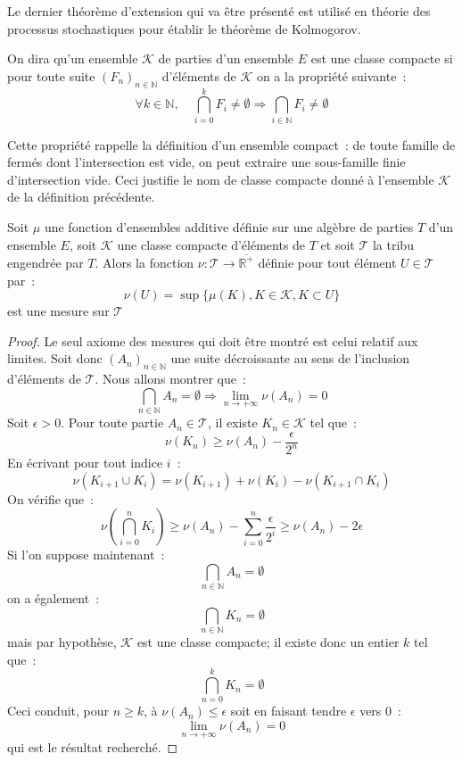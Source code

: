 Le dernier théorème d'extension qui va être présenté est utilisé en théorie des
processus stochastiques pour établir le théorème de Kolmogorov.
\begin{defn}
On dira qu'un ensemble $\mathcal{K}$ de parties d'un ensemble $E$ est une classe compacte
si pour toute suite $(F_n)_{n \in \mathbb{N}}$ d'\'el\'ements de $\mathcal{K}$ on a 
la propri\'et\'e suivante~:
\[
\forall k \in \mathbb{N}, \quad \bigcap_{i=0}^k F_i \neq \emptyset
\Rightarrow \bigcap_{i \in \mathbb{N}} F_i \neq \emptyset
\]
\end{defn}

Cette propri\'et\'e rappelle la d\'efinition d'un ensemble compact~: de toute famille
de ferm\'es dont l'intersection est vide, on peut extraire une sous-famille finie 
d'intersection vide. Ceci justifie le nom de classe compacte donn\'e \`a l'ensemble
$\mathcal{K}$ de la d\'efinition pr\'ec\'edente.

\begin{prop}
Soit $\mu$ une fonction d'ensembles additive d\'efinie sur une alg\`ebre de parties
$T$ d'un ensemble $E$, soit $\mathcal{K}$ une classe compacte d'\'el\'ements de $T$
et soit $\mathcal{T}$ la tribu engendr\'ee par $T$. Alors
la fonction $\nu : \mathcal{T} \to \overline{\mathbb{R}^+}$ d\'efinie 
pour tout \'el\'ement $U \in \mathcal{T}$ par~:
\[
\nu(U) = \sup \{\mu(K), K \in \mathcal{K}, K \subset U \}
\]
est une mesure sur $\mathcal{T}$
\end{prop}
\begin{proof}
Le seul axiome des mesures qui doit \^etre montr\'e est celui relatif aux limites. 
Soit donc $(A_n)_{n \in \mathbb{N}}$ une suite d\'ecroissante au sens de l'inclusion 
d'\'el\'ements de $\mathcal{T}$. Nous allons montrer que~:
\[
\bigcap_{n \in \mathbb{N}} A_n = \emptyset \Rightarrow \lim_{n \to +\infty} \nu(A_n) = 0
\]
Soit $\epsilon > 0$. Pour toute partie $A_n \in \mathcal{T}$, il existe $K_n \in \mathcal{K}$
tel que~:
$$
\nu(K_n) \geq \nu(A_n) - \frac{\epsilon}{2^n}
$$
En \'ecrivant pour tout indice $i$~:
\[
\nu(K_{i+1} \cup K_i ) = \nu(K_{i+1}) + \nu(K_i) - \nu(K_{i+1} \cap K_i)
\]
On v\'erifie que~:
\[
\nu \left ( \bigcap_{i=0}^n K_i \right ) \geq
\nu(A_n) - \sum_{i=0}^n \frac{\epsilon}{2^i} \geq \nu(A_n) - 2 \epsilon
\]
Si l'on suppose maintenant~:
\[
\bigcap_{n \in \mathbb{N}} A_n  = \emptyset
\]
on a \'egalement~:
\[
\bigcap_{n \in \mathbb{N}} K_n  = \emptyset
\]
mais par hypoth\`ese, $\mathcal{K}$ est une classe compacte; il existe donc 
un entier $k$ tel que~:
\[
\bigcap_{n=0}^k K_n  =\emptyset
\]
Ceci conduit, pour $n \geq k$, \`a $\nu(A_n) \leq \epsilon$ soit en faisant tendre $\epsilon$
vers 0~:
\[ 
\lim_{n \to + \infty} \nu(A_n) = 0
\]
qui est le r\'esultat recherch\'e.
\end{proof}
